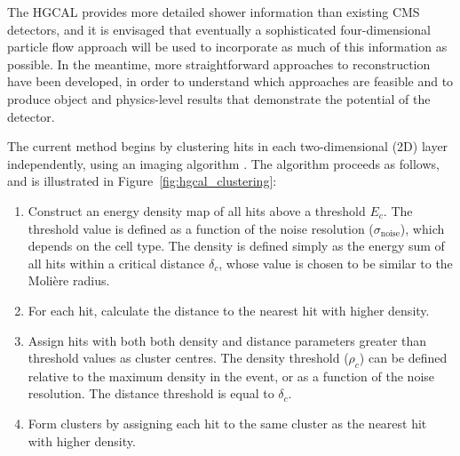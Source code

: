 The HGCAL provides more detailed shower information than existing CMS detectors, 
and it is envisaged that eventually a sophisticated four-dimensional particle flow approach will be used to incorporate as much of this information as possible. 
In the meantime, more straightforward approaches to reconstruction have been developed, 
in order to understand which approaches are feasible and to produce object and physics-level results that demonstrate the potential of the detector. 

The current method begins by clustering hits in each two-dimensional (2D) layer independently, using an imaging algorithm \cite{ClusteringAlgo}.
The algorithm proceeds as follows, and is illustrated in Figure~\ref{fig:hgcal_clustering}:
\begin{enumerate}
  \item Construct an energy density map of all hits above a threshold $E_c$. 
  The threshold value is defined as a function of the noise resolution ($\sigma_{\textrm{noise}}$), which depends on the cell type.
  The density is defined simply as the energy sum of all hits within a critical distance $\delta_c$, 
  whose value is chosen to be similar to the Moli\`ere radius. %
  \item For each hit, calculate the distance to the nearest hit with higher density.
  \item Assign hits with both both density and distance parameters greater than threshold values as cluster centres.
  The density threshold ($\rho_c$) can be defined relative to the maximum density in the event,
  or as a function of the noise resolution.
  The distance threshold is equal to $\delta_c$.
  \item Form clusters by assigning each hit to the same cluster as the nearest hit with higher density.
\end{enumerate}

